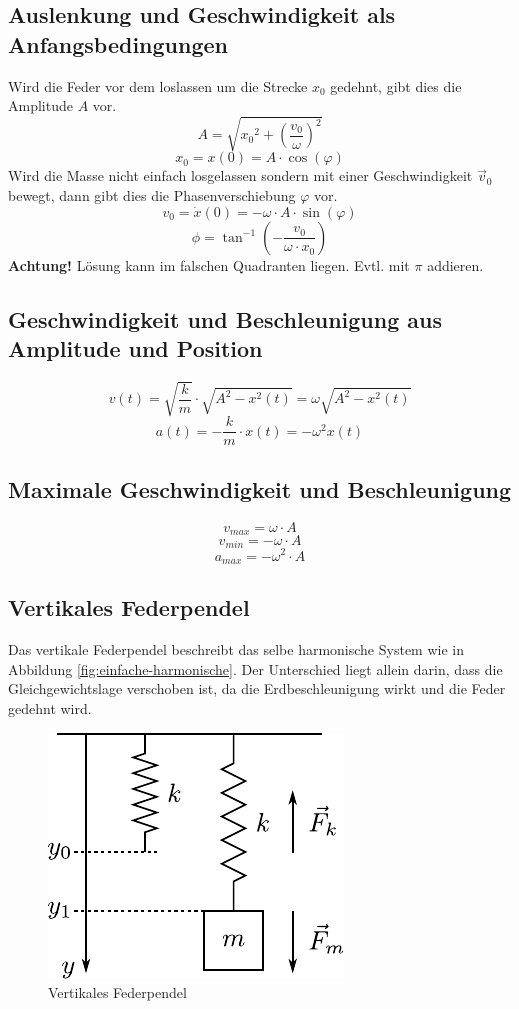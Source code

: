 \subsection{Auslenkung und Geschwindigkeit als Anfangsbedingungen}
Wird die Feder vor dem loslassen um die Strecke $x_0$ gedehnt, gibt 
dies die Amplitude $A$ vor. 
\[ \boxed{A = \sqrt{{x_0}^2 + \left(\frac{v_0}{\omega}\right)^2}} \]
\[ \boxed{x_0 = x(0) = A \cdot \cos(\varphi)} \]
Wird die Masse nicht einfach losgelassen
sondern mit einer Geschwindigkeit $\vec{v}_0$ bewegt, dann gibt dies
die Phasenverschiebung $\varphi$ vor.
\[ \boxed{v_0 = \dot{x}(0) = - \omega \cdot A \cdot \sin(\varphi)} \]
\[ \boxed{\phi = \tan^{-1}\left(-\frac{v_0}{\omega \cdot x_0}\right)} \]
\textbf{Achtung!} Lösung kann im falschen Quadranten liegen. 
Evtl. mit $\pi$ addieren. 


\subsection{Geschwindigkeit und Beschleunigung aus Amplitude und Position}
\[ \boxed{v(t) = \sqrt{\frac{k}{m}} \cdot \sqrt{A^2 - x^2(t)}
	= \omega \sqrt{A^2 - x^2(t)}} \]
\[ \boxed{a(t) = - \frac{k}{m} \cdot x(t) = - \omega^2 x(t)} \]

\subsection{Maximale Geschwindigkeit und Beschleunigung}
\[ \boxed{v_{max} = \omega \cdot A} \]
\[ \boxed{v_{min} = -\omega \cdot A} \]
\[ \boxed{a_{max} = -\omega^2 \cdot A} \]

\subsection{Vertikales Federpendel}
Das vertikale Federpendel beschreibt das selbe harmonische System wie in
Abbildung \ref{fig:einfache-harmonische}. Der Unterschied liegt allein 
darin, dass die Gleichgewichtslage verschoben ist, da die Erdbeschleunigung 
wirkt und die Feder gedehnt wird.

\begin{figure}[h!]
	\centering
	\includegraphics[scale=0.75]{../fig/federpendel-vertikal.pdf}
	\caption{Vertikales Federpendel}
	\label{fig:federpendel-vertikal}
\end{figure}


